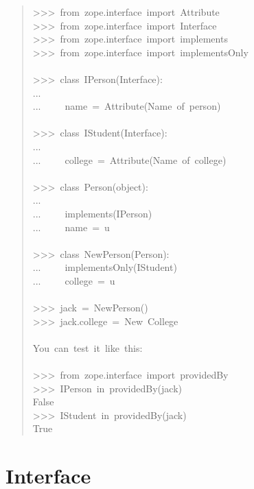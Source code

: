 \documentclass[a4paper,openany,twoside,final]{book}
\begin{document}
\begin{quote}{\ttfamily \raggedright \noindent
>{}>{}>~from~zope.interface~import~Attribute\\
>{}>{}>~from~zope.interface~import~Interface\\
>{}>{}>~from~zope.interface~import~implements\\
>{}>{}>~from~zope.interface~import~implementsOnly\\
~\\
>{}>{}>~class~IPerson(Interface):\\
...\\
...~~~~~name~=~Attribute(\textquotedbl{}Name~of~person\textquotedbl{})\\
~\\
>{}>{}>~class~IStudent(Interface):\\
...\\
...~~~~~college~=~Attribute(\textquotedbl{}Name~of~college\textquotedbl{})\\
~\\
>{}>{}>~class~Person(object):\\
...\\
...~~~~~implements(IPerson)\\
...~~~~~name~=~u\textquotedbl{}\textquotedbl{}\\
~\\
>{}>{}>~class~NewPerson(Person):\\
...~~~~~implementsOnly(IStudent)\\
...~~~~~college~=~u\textquotedbl{}\textquotedbl{}\\
~\\
>{}>{}>~jack~=~NewPerson()\\
>{}>{}>~jack.college~=~\textquotedbl{}New~College\textquotedbl{}\\
~\\
You~can~test~it~like~this:\\
~\\
>{}>{}>~from~zope.interface~import~providedBy\\
>{}>{}>~IPerson~in~providedBy(jack)\\
False\\
>{}>{}>~IStudent~in~providedBy(jack)\\
True
}
\end{quote}


\section*{Interface%
  \label{interface}%
}
\end{document}
